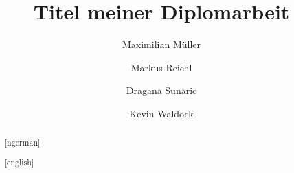 \documentclass[minted]{thesis}
\title{Titel meiner Diplomarbeit}
\author{Maximilian Müller \and Markus Reichl \and Dragana Sunaric \and Kevin Waldock}
\begin{document}
\begin{abstract}[ngerman]

\end{abstract}
\begin{abstract}[english]

\end{abstract}
\tableofcontents\glsresetall
\pagestyle{fancy}










\end{document}
